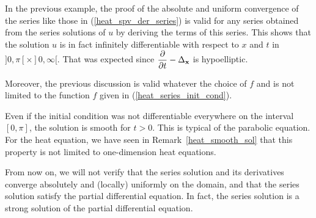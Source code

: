\begin{rmk}
In the previous example, the proof of the absolute and uniform
convergence of the series like those in (\ref{heat_spv_der_series}) is
valid for any series obtained from the series solutions of $u$ by deriving the
terms of this series.  This shows that the solution $u$ is in fact
infinitely differentiable with respect to $x$ and $t$ in
$]0,\pi[\times ]0,\infty[$.  That was expected since
$\displaystyle \frac{\partial{}}{\partial t} - \Delta_{\mathbf{x}}$ is hypoelliptic.

Moreover, the previous discussion is valid whatever the choice of $f$
and is not limited to the function $f$ given in (\ref{heat_series_init_cond}).

Even if the initial condition was not differentiable everywhere on
the interval $[0,\pi]$, the solution is smooth for $t>0$.  This is
typical of the parabolic equation.  For the heat equation, we have
seen in Remark~\ref{heat_smooth_sol} that this property is not limited
to one-dimension heat equations.
\end{rmk}

From now on, we will not verify that the series solution and its
derivatives converge absolutely and (locally) uniformly on the domain,
and that the series solution satisfy the partial differential
equation.  In fact, the series solution is a strong solution of the
partial differential equation.

